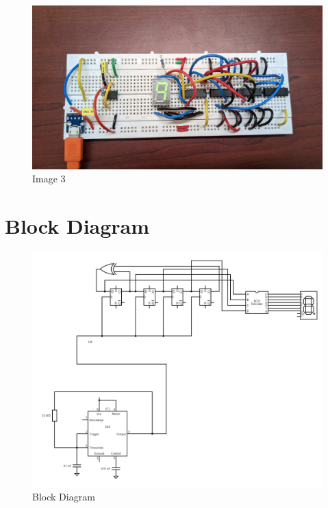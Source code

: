 \documentclass{article}
\begin{document}
\FloatBarrier
\begin{figure}[ht]
\centering
\includegraphics[width=0.7\linewidth]{images/9.jpg}
\caption{Image 3}
\end{figure}
\FloatBarrier
\section{Block Diagram}
\begin{figure}[ht]
\centering
\includegraphics[width=0.7\linewidth]{images/BlockDiagram.png}
\caption{Block Diagram}
\end{figure}
\FloatBarrier
\end{document}
